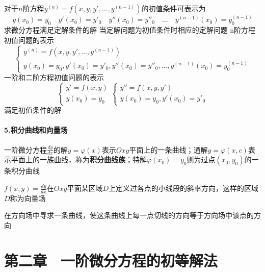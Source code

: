 \documentclass[oneside]{book} %
\begin{document}
\noindent {}对于$n$阶方程$y^{(n)} = f(x,y,y',\dots,y^{(n-1)})$的初值条件可表示为
$$y(x_{0}) = y_{0} \quad y'(x_{0}) = y'_{0} \quad y''(x_{0}) = y''_{0} \quad \dots \quad y^{(n-1)}(x_{0}) = y^{(n-1)}_{0}$$
求微分方程满足定解条件的解
当定解问题为初值条件时相应的定解问题
n阶方程初值问题的表示
\[
\begin{cases}
    y^{(n)} = f(x,y,y',\dots,y^{(n-1)}) \\
    y(x_{0}) = y_{0} , y'(x_{0}) = y'_{0} , y''(x_{0}) = y''_{0} , \dots , y^{(n-1)}(x_{0}) = y^{(n-1)}_{0}
\end{cases}\]
一阶和二阶方程初值问题的表示
\[
\begin{cases}
    y' = f(x,y) \\
    y(x_{0}) = y_{0}
\end{cases}
\begin{cases}
    y'' = f(x,y,y') \\
    y(x_{0}) = y_{0} , y'(x_{0}) = y'_{0}
\end{cases}
\]
满足初值条件的解

\subsubsection{5.积分曲线和向量场}
\noindent {}一阶微分方程$\frac{dy}{dx}$的解$y = \varphi(x)$表示$Oxy$平面上的一条曲线；通解$y = \varphi(x,c)$表示平面上的一族曲线，称为\textbf{积分曲线族}；特解$\varphi(x_{0}) = y_{0}$则为过点$(x_{0},y_{0})$的一条积分曲线

\noindent {}$f(x , y) = \frac{dy}{dx}$在$Oxy$平面某区域$D$上定义过各点的小线段的斜率方向，这样的区域$D$称为向量场

\noindent {}在方向场中寻求一条曲线，使这条曲线上每一点切线的方向等于方向场中该点的方向

\chapter{第二章 \ 一阶微分方程的初等解法}
\end{document}
